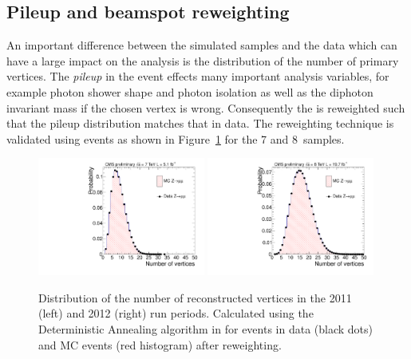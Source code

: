 \subsection{Pileup and beamspot reweighting}
\label{sec:pileup_beamspot}

An important difference between the simulated samples and the data which can have a large impact on the analysis is the distribution of the number of primary vertices. The \emph{pileup} in the event effects many important analysis variables, for example photon shower shape and photon isolation as well as the diphoton invariant mass if the chosen vertex is wrong. Consequently the \MC is reweighted such that the pileup distribution matches that in data. The reweighting technique is validated using \Zmumu events as shown in Figure~\ref{fig:pileup} for the 7 and 8~\TeV samples. 

\begin{figure}
  \begin{center}
  \includegraphics[width=0.49\textwidth]{analysis_comps/plots/nvtx_zmumu_2011.pdf}
  \includegraphics[width=0.49\textwidth]{analysis_comps/plots/nvtx_zmumu_2012.pdf}
  \caption[Distribution of the number of reconstructed vertices]{Distribution of the number of reconstructed vertices in the 2011 (left) and 2012 (right) run periods. Calculated using the Deterministic Annealing algorithm in  for \Zmumu events in data (black dots) and MC events (red histogram) after reweighting.}
  \label{fig:pileup}
  \end{center}
\end{figure}

